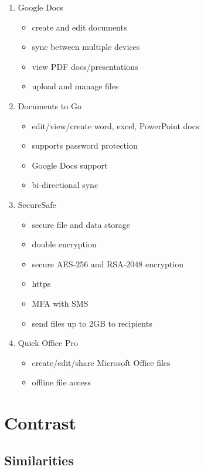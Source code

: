\begin{enumerate}
    \item Google Docs
        \begin{itemize}
            \item create and edit documents
            \item sync between multiple devices
            \item view PDF docs/presentations
            \item upload and manage files
        \end{itemize}
    \item Documents to Go
        \begin{itemize}
            \item edit/view/create word, excel, PowerPoint docs
            \item supports password protection
            \item Google Docs support
            \item bi-directional sync
        \end{itemize}
    \item SecureSafe
        \begin{itemize}
            \item secure file and data storage
            \item double encryption
            \item secure AES-256 and RSA-2048 encryption
            \item https
            \item MFA with SMS
            \item send files up to 2GB to recipients
        \end{itemize}
    \item Quick Office Pro
        \begin{itemize}
            \item create/edit/share Microsoft Office files
            \item offline file access
        \end{itemize}
    \end{enumerate}

\section{Contrast}

    \subsection{Similarities}

